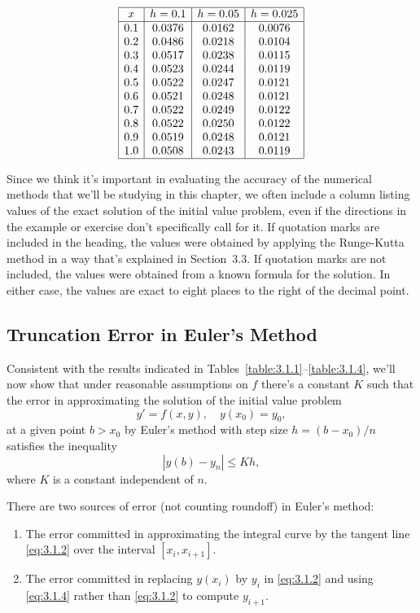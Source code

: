 \documentclass{ximera}
\begin{document}
\begin{example}
$$\begin{array}{|c|c|c|c|}
\hline
x&
h=0.1&
h=0.05&
h=0.025\\ \hline
0.1 & 0.0376 & 0.0162 &0.0076 \\
0.2 & 0.0486 & 0.0218 &0.0104 \\
0.3 & 0.0517 & 0.0238 &0.0115 \\
0.4 & 0.0523 & 0.0244 &0.0119 \\
0.5 & 0.0522 & 0.0247 &0.0121 \\
0.6 & 0.0521 & 0.0248 &0.0121 \\
0.7 & 0.0522 & 0.0249 &0.0122 \\
0.8 & 0.0522 & 0.0250 &0.0122 \\
0.9 & 0.0519 & 0.0248 &0.0121 \\
1.0 & 0.0508 & 0.0243 &0.0119 \\
\hline
\end{array}
$$

\end{example}


Since we think it's important in evaluating the accuracy of the
numerical methods that we'll be studying in this chapter, we
often include a column listing values of the exact solution of the
initial value problem, even if the directions in the example or
exercise don't specifically call for it. If  quotation marks are
included in the heading, the values were obtained by applying the
Runge-Kutta method in a way that's explained in Section~3.3.
If  quotation marks are not included,  the values were
obtained from a known formula for the solution.
In either case, the values are exact to eight places to the
right of the decimal point.

\subsection*{Truncation Error in Euler's Method}

Consistent with the results indicated in
Tables~\ref{table:3.1.1}--\ref{table:3.1.4}, we'll now show that under
reasonable assumptions on $f$ there's a constant $K$ such that
the error in approximating the solution of the initial value problem
$$
y'=f(x,y),\quad y(x_0)=y_0,
$$
at a given point $b>x_0$ by Euler's method with step size
$h=(b-x_0)/n$ satisfies the inequality
$$
|y(b)-y_n|\leq Kh,
$$
where $K$ is a constant independent of $n$.


There are two sources of error (not counting roundoff) in Euler's
method:
\begin{enumerate}
\item\label{item:3.1.1a} %
The error committed in approximating the integral curve by the tangent
line \eqref{eq:3.1.2} over the interval $[x_i,x_{i+1}]$.
\item\label{item:3.1.1b} %
The error committed in replacing $y(x_i)$ by $y_i$ in
\eqref{eq:3.1.2} and using \eqref{eq:3.1.4} rather than \eqref{eq:3.1.2} to
compute $y_{i+1}$.
 \end{enumerate}
\end{document}
